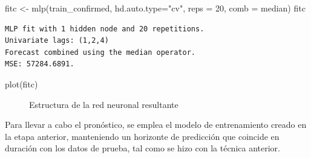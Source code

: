 \documentclass[
  letterpaper,
  DIV=11,
  numbers=noendperiod]{scrreport}
\newenvironment{Shaded}{\begin{snugshade}}{\end{snugshade}}
\newcommand{\AttributeTok}[1]{\textcolor[rgb]{0.40,0.45,0.13}{#1}}
\newcommand{\DecValTok}[1]{\textcolor[rgb]{0.68,0.00,0.00}{#1}}
\newcommand{\FunctionTok}[1]{\textcolor[rgb]{0.28,0.35,0.67}{#1}}
\newcommand{\NormalTok}[1]{\textcolor[rgb]{0.00,0.23,0.31}{#1}}
\newcommand{\OtherTok}[1]{\textcolor[rgb]{0.00,0.23,0.31}{#1}}
\newcommand{\StringTok}[1]{\textcolor[rgb]{0.13,0.47,0.30}{#1}}
\theoremstyle{plain}
\theoremstyle{definition}
\theoremstyle{definition}
\theoremstyle{plain}
\theoremstyle{remark}
\begin{document}
\begin{Shaded}
\begin{Highlighting}[]
\NormalTok{fitc }\OtherTok{\textless{}{-}} \FunctionTok{mlp}\NormalTok{(train\_confirmed, }\AttributeTok{hd.auto.type=}\StringTok{"cv"}\NormalTok{, }\AttributeTok{reps =} \DecValTok{20}\NormalTok{, }\AttributeTok{comb =} \StringTok{\textquotesingle{}median\textquotesingle{}}\NormalTok{)}
\NormalTok{fitc}
\end{Highlighting}
\end{Shaded}

\begin{verbatim}
MLP fit with 1 hidden node and 20 repetitions.
Univariate lags: (1,2,4)
Forecast combined using the median operator.
MSE: 57284.6891.
\end{verbatim}

\begin{Shaded}
\begin{Highlighting}[]
\FunctionTok{plot}\NormalTok{(fitc)}
\end{Highlighting}
\end{Shaded}

\begin{figure}


\caption{\label{fig-red}Estructura de la red neuronal resultante}

\end{figure}%

Para llevar a cabo el pronóstico, se emplea el modelo de entrenamiento
creado en la etapa anterior, manteniendo un horizonte de predicción que
coincide en duración con los datos de prueba, tal como se hizo con la
técnica anterior.
\end{document}
